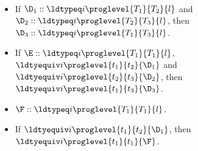 \begin{lemma} $ $
  \begin{itemize}
  \item If $\D_1 :: \ldtypeq i \proglevel{T_1}{T_2}{l}$ and $\D_2 :: \ldtypeq i
    \proglevel{T_2}{T_3}{l}$, then $\D_3 :: \ldtypeq i \proglevel{T_1}{T_3}{l}$.
  \item If $\E :: \ldtypeq i \proglevel{T_1}{T_1}{l}$, $\ldtyequiv i \proglevel{t_1}{t_2}{\D_1}$ and
    $\ldtyequiv i \proglevel{t_2}{t_3}{\D_2}$, then $\ldtyequiv i \proglevel{t_1}{t_3}{\D_3}$.
  \item $\F :: \ldtypeq i \proglevel{T_1}{T_1}{l}$.
  \item If $\ldtyequiv i \proglevel{t_1}{t_2}{\D_1}$, then $\ldtyequiv i \proglevel{t_1}{t_1}{\F}$.
  \end{itemize}
\end{lemma}
